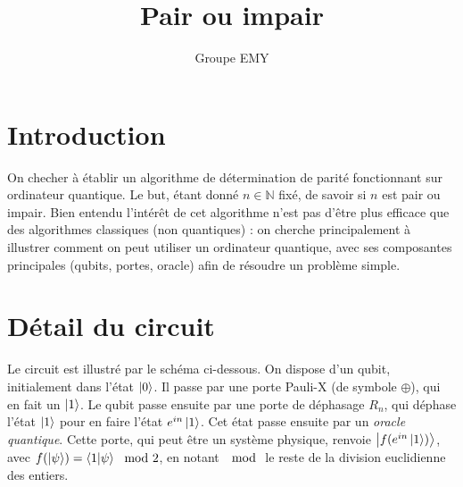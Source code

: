 \documentclass{article}
\title{Pair ou impair}
\author{Groupe EMY}
\begin{document}
\maketitle

\section{Introduction}

On checher à établir un algorithme de détermination de parité fonctionnant sur ordinateur quantique. Le but, étant donné $n \in \mathbb{N}$ fixé, de savoir si $n$ est pair ou impair. Bien entendu l'intérêt de cet algorithme n'est pas d'être plus efficace que des algorithmes classiques (non quantiques) : on cherche principalement à illustrer comment on peut utiliser un ordinateur quantique, avec ses composantes principales (qubits, portes, oracle) afin de résoudre un problème simple.

\section{Détail du circuit}

Le circuit est illustré par le schéma ci-dessous. On dispose d'un qubit, initialement dans l'état $\ket 0$. Il passe par une porte Pauli-X (de symbole $\oplus$), qui en fait un $\ket 1$. Le qubit passe ensuite par une porte de déphasage $R_n$, qui déphase l'état $\ket 1$ pour en faire l'état $e^{in} \ket 1$. Cet état passe ensuite par un \textit{oracle quantique}. Cette porte, qui peut être un système physique, renvoie $\ket{f(e^{in}\ket{1})}$, avec $f(\ket{\psi}) = \bra{1}\ket{\psi} \mod 2$, en notant $\mod$ le reste de la division euclidienne des entiers.

\end{document}

